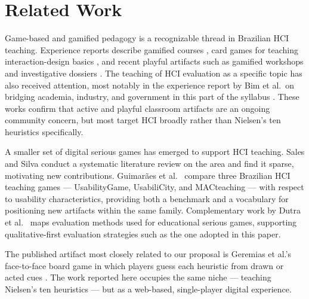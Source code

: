 \section{Related Work}
\label{sec:related}

Game-based and gamified pedagogy is a recognizable thread in Brazilian HCI teaching. Experience reports describe gamified courses \cite{miranda2019gamificacao}, card games for teaching interaction-design basics \cite{darin2019goople}, and recent playful artifacts such as gamified workshops and investigative dossiers \cite{santos2025ihcweek,rodrigues2025dossies}. The teaching of HCI evaluation as a specific topic has also received attention, most notably in the experience report by Bim et al.\ on bridging academia, industry, and government in this part of the syllabus \cite{bim2019pontes}. These works confirm that active and playful classroom artifacts are an ongoing community concern, but most target HCI broadly rather than Nielsen's ten heuristics specifically.

A smaller set of digital serious games has emerged to support HCI teaching. Sales and Silva \cite{sales2020jogosserios} conduct a systematic literature review on the area and find it sparse, motivating new contributions. Guimar\~{a}es et al.\ \cite{guimaraes2022avaliacao} compare three Brazilian HCI teaching games --- UsabilityGame, UsabiliCity, and MACteaching --- with respect to usability characteristics, providing both a benchmark and a vocabulary for positioning new artifacts within the same family. Complementary work by Dutra et al.\ \cite{dutra2021mapeamento} maps evaluation methods used for educational serious games, supporting qualitative-first evaluation strategies such as the one adopted in this paper.

The published artifact most closely related to our proposal is Geremias et al.'s face-to-face board game in which players guess each heuristic from drawn or acted cues \cite{geremias2022desvendando}. The work reported here occupies the same niche --- teaching Nielsen's ten heuristics --- but as a web-based, single-player digital experience. %
